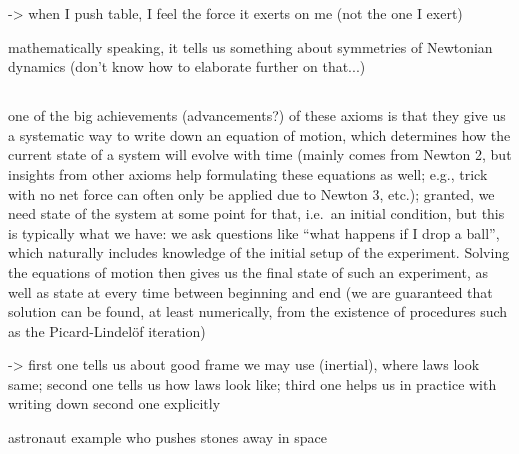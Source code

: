 \documentclass[../class_mech_main.tex]{subfiles}
\begin{document}
-> when I push table, I feel the force it exerts on me (not the one I exert)


mathematically speaking, it tells us something about symmetries of Newtonian dynamics (don't know how to elaborate further on that...)



		\subsection{}

one of the big achievements (advancements?) of these axioms is that they give us a systematic way to write down an equation of motion, which determines how the current state of a system will evolve with time (mainly comes from Newton 2, but insights from other axioms help formulating these equations as well; e.g., trick with no net force can often only be applied due to Newton 3, etc.); granted, we need state of the system at some point for that, i.e.~an initial condition, but this is typically what we have: we ask questions like \enquote{what happens if I drop a ball}, which naturally includes knowledge of the initial setup of the experiment. Solving the equations of motion then gives us the final state of such an experiment, as well as state at every time between beginning and end (we are guaranteed that solution can be found, at least numerically, from the existence of procedures such as the Picard-Lindelöf iteration)

-> first one tells us about good frame we may use (inertial), where laws look same; second one tells us how laws look like; third one helps us in practice with writing down second one explicitly


\begin{ex}
	astronaut example who pushes stones away in space
\end{ex}
\end{document}
